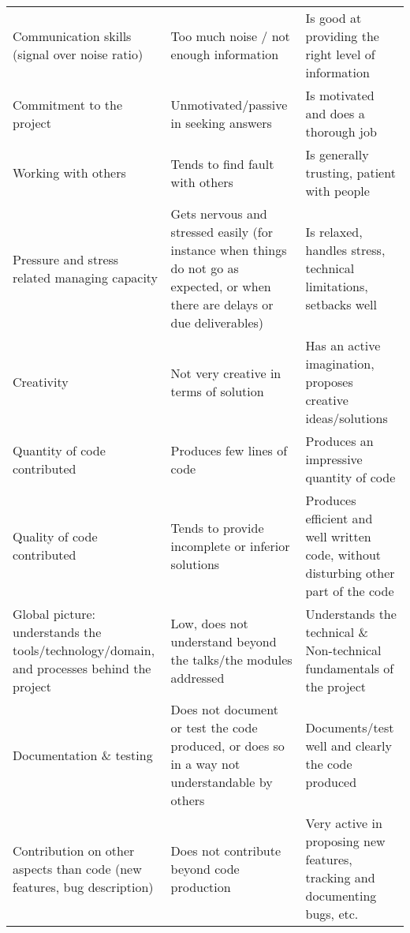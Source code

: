\begin{table}
{\begin{tabular}{p{}@{\hskip 6\tabcolsep}p{}@{\hskip 6\tabcolsep}p{}}
Communication skills (signal over noise ratio) & Too much noise / not enough information & Is good at providing the right level of information  \\
Commitment to the project & Unmotivated/passive in seeking answers & Is motivated and does a thorough job \\
Working with others & Tends to find fault with others & Is generally trusting, patient with people \\
Pressure and stress related managing capacity & Gets nervous and stressed easily (for instance when things do not go as expected, or when there are delays or due deliverables) & Is relaxed, handles stress, technical limitations, setbacks well \\
Creativity & Not very creative in terms of solution & Has an active imagination, proposes creative ideas/solutions \\
Quantity of code contributed & Produces few lines of code & Produces an impressive quantity of code  \\
Quality of code contributed & Tends to provide incomplete or inferior solutions & Produces efficient and well written code, without disturbing other
part of the code  \\
Global picture: understands the tools/technology/domain, and processes behind the project  & Low, does not understand beyond the talks/the modules addressed  & Understands the technical \& Non-technical fundamentals of the project  \\
Documentation \& testing & Does not document or test the code produced, or does so in a way not understandable
by others & Documents/test well and clearly the code produced \\
Contribution on other aspects than code (new features, bug description) & Does not contribute beyond code production & Very active in proposing new features, tracking and documenting bugs,
etc. \\
\bottomrule
\end{tabular}
}
\renewcommand{\arraystretch}{1}
\end{table}
